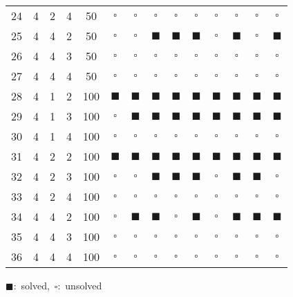 \begin{table}[!htb]
{\begin{tabular}{c | c c c c | c | c | c | c | c | c | c | c | c}
			24 & 4 & 2 & 4 & 50 & $\square$ & $\square$ & $\square$ & $\square$ & $\square$ & $\square$ & $\square$ & $\square$ & $\square$ \\
			25 & 4 & 4 & 2 & 50 & $\square$ & $\square$ & $\blacksquare$ & $\blacksquare$ & $\blacksquare$ & $\square$ & $\blacksquare$ & $\square$ & $\blacksquare$ \\
			26 & 4 & 4 & 3 & 50 & $\square$ & $\square$ & $\square$ & $\square$ & $\square$ & $\square$ & $\square$ & $\square$ & $\square$ \\
			27 & 4 & 4 & 4 & 50 & $\square$ & $\square$ & $\square$ & $\square$ & $\square$ & $\square$ & $\square$ & $\square$ & $\square$ \\
			28 & 4 & 1 & 2 & 100 & $\blacksquare$ & $\blacksquare$ & $\blacksquare$ & $\blacksquare$ & $\blacksquare$ & $\blacksquare$ & $\blacksquare$ & $\blacksquare$ & $\blacksquare$ \\
			29 & 4 & 1 & 3 & 100 & $\square$ & $\blacksquare$ & $\blacksquare$ & $\blacksquare$ & $\blacksquare$ & $\blacksquare$ & $\blacksquare$ & $\blacksquare$ & $\blacksquare$ \\
			30 & 4 & 1 & 4 & 100 & $\square$ & $\square$ & $\square$ & $\square$ & $\square$ & $\square$ & $\square$ & $\square$ & $\square$ \\
			31 & 4 & 2 & 2 & 100 & $\blacksquare$ & $\blacksquare$ & $\blacksquare$ & $\blacksquare$ & $\blacksquare$ & $\blacksquare$ & $\blacksquare$ & $\blacksquare$ & $\blacksquare$ \\
			32 & 4 & 2 & 3 & 100 & $\square$ & $\square$ & $\blacksquare$ & $\blacksquare$ & $\blacksquare$ & $\square$ & $\blacksquare$ & $\blacksquare$ & $\square$ \\ 
			33 & 4 & 2 & 4 & 100 & $\square$ & $\square$ & $\square$ & $\square$ & $\square$ & $\square$ & $\square$ & $\square$ & $\square$ \\
			34 & 4 & 4 & 2 & 100 & $\square$ & $\blacksquare$ & $\blacksquare$ & $\square$ & $\blacksquare$ & $\square$ & $\blacksquare$ & $\blacksquare$ & $\blacksquare$ \\
			35 & 4 & 4 & 3 & 100 & $\square$ & $\square$ & $\square$ & $\square$ & $\square$ & $\square$ & $\square$ & $\square$ & $\square$ \\
			36 & 4 & 4 & 4 & 100 & $\square$ & $\square$ & $\square$ & $\square$ & $\square$ & $\square$ & $\square$ & $\square$ & $\square$ \\
			\hline
		\end{tabular}
	}

	\mbox{$\blacksquare$: solved, $\square$: unsolved}
\end{table}
